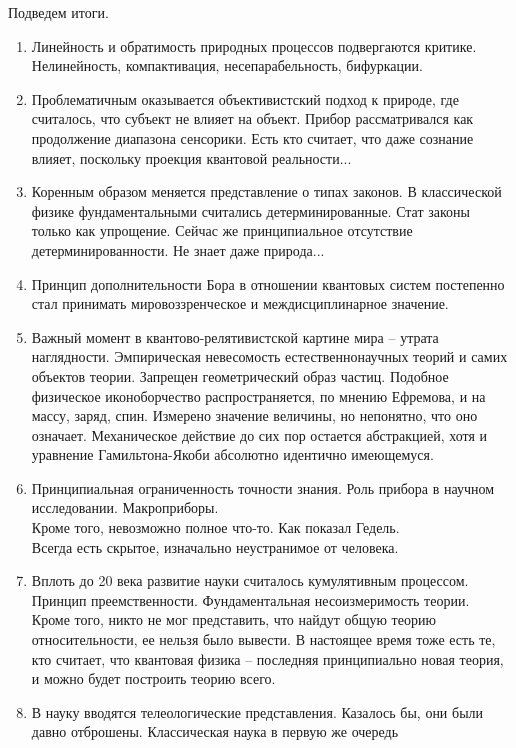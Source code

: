 \documentclass[a4paper, 12pt]{article}
\begin{document}
Подведем итоги.
\begin{enumerate}
  \item Линейность и обратимость природных процессов подвергаются 
    критике. Нелинейность, компактивация, несепарабельность, бифуркации.
  \item Проблематичным оказывается объективистский подход к природе, где 
    считалось, что субъект не влияет на объект. Прибор рассматривался 
    как продолжение диапазона сенсорики. Есть кто считает, что даже 
    сознание влияет, поскольку проекция квантовой реальности...
  \item Коренным образом меняется представление о типах законов. 
    В классической физике фундаментальными считались детерминированные. 
    Стат законы только как упрощение. Сейчас же принципиальное 
    отсутствие детерминированности. Не знает даже природа...
  \item Принцип дополнительности Бора в отношении квантовых систем 
    постепенно стал принимать мировоззренческое и междисциплинарное 
    значение.
  \item Важный момент в квантово-релятивистской картине мира -- утрата 
    наглядности. Эмпирическая невесомость естественнонаучных теорий 
    и самих объектов теории. Запрещен геометрический образ частиц. 
    Подобное физическое иконоборчество распространяется, по мнению 
    Ефремова, и на массу, заряд, спин. Измерено значение величины, но 
    непонятно, что оно означает. Механическое действие до сих пор 
    остается абстракцией, хотя и уравнение Гамильтона-Якоби абсолютно 
    идентично имеющемуся.
  \item Принципиальная ограниченность точности знания. Роль прибора 
    в научном исследовании. Макроприборы.
    \\ Кроме того, невозможно полное что-то. Как показал Гедель.
    \\ Всегда есть скрытое, изначально неустранимое от человека.
  \item Вплоть до 20 века развитие науки считалось кумулятивным 
    процессом. Принцип преемственности. Фундаментальная несоизмеримость 
    теории. Кроме того, никто не мог представить, что найдут общую 
    теорию относительности, ее нельзя было вывести. В настоящее время 
    тоже есть те, кто считает, что квантовая физика -- последняя 
    принципиально новая теория, и можно будет построить теорию всего.
  \item В науку вводятся телеологические представления. Казалось бы, они 
    были давно отброшены. Классическая наука в первую же очередь 

\end{enumerate}
\end{document}
